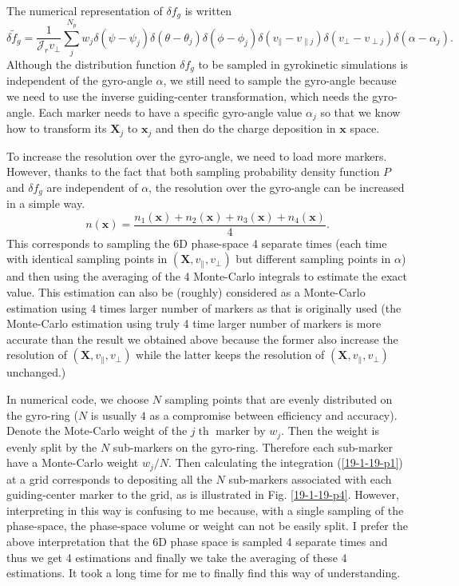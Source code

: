 \documentclass{llncs}
\newcommand{\tmop}[1]{\ensuremath{\operatorname{#1}}}
\begin{document}
The numerical representation of $\delta f_g$ is written
\begin{equation}
  \delta \tilde{f}_g = \frac{1}{\mathcal{J}_r v_{\perp}} \sum_j^{N_p} w_j
  \delta (\psi - \psi_j) \delta (\theta - \theta_j) \delta (\phi - \phi_j)
  \delta (v_{\parallel} - v_{\parallel j}) \delta (v_{\perp} - v_{\perp j})
  \delta (\alpha - \alpha_j) .
\end{equation}
Although the distribution function $\delta f_g$ to be sampled in gyrokinetic
simulations is independent of the gyro-angle $\alpha$, we still need to sample
the gyro-angle because we need to use the inverse guiding-center
transformation, which needs the gyro-angle. Each marker needs to have a
specific gyro-angle value $\alpha_j$ so that we know how to transform its
$\mathbf{X}_j$ to $\mathbf{x}_j$ and then do the charge deposition in
$\mathbf{x}$ space.

To increase the resolution over the gyro-angle, we need to load more markers.
However, thanks to the fact that both sampling probability density function
$P$ and $\delta f_g$ are independent of $\alpha$, the resolution over the
gyro-angle can be increased in a simple way.
\begin{equation}
  n (\mathbf{x}) = \frac{n_1 (\mathbf{x}) + n_2 (\mathbf{x}) + n_3
  (\mathbf{x}) + n_4 (\mathbf{x})}{4} .
\end{equation}
This corresponds to sampling the 6D phase-space 4 separate times (each time
with identical sampling points in $(\mathbf{X}, v_{\parallel}, v_{\perp})$ but
different sampling points in $\alpha$) and then using the averaging of the 4
Monte-Carlo integrals to estimate the exact value. This estimation can also be
(roughly) considered as a Monte-Carlo estimation using 4 times larger number
of markers as that is originally used (the Monte-Carlo estimation using truly
4 time larger number of markers is more accurate than the result we obtained
above because the former also increase the resolution of $(\mathbf{X},
v_{\parallel}, v_{\perp})$ while the latter keeps the resolution of
$(\mathbf{X}, v_{\parallel}, v_{\perp})$ unchanged.)

In numerical code, we choose $N$ sampling points that are evenly distributed
on the gyro-ring ($N$ is usually $4$ as a compromise between efficiency and
accuracy). Denote the Mote-Carlo weight of the $j \tmop{th}$ marker by $w_j$.
Then the weight is evenly split by the $N$ sub-markers on the gyro-ring.
Therefore each sub-marker have a Monte-Carlo weight $w_j / N$. Then
calculating the integration (\ref{19-1-19-p1}) at a grid corresponds to
depositing all the $N$ sub-markers associated with each guiding-center marker
to the grid, as is illustrated in Fig. \ref{19-1-19-p4}. However, interpreting
in this way is confusing to me because, with a single sampling of the
phase-space, the phase-space volume or weight can not be easily split. I
prefer the above interpretation that the 6D phase space is sampled 4 separate
times and thus we get 4 estimations and finally we take the averaging of these
4 estimations. It took a long time for me to finally find this way of
understanding.
\end{document}
